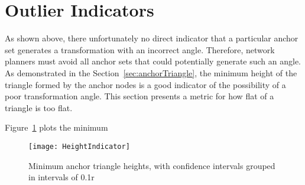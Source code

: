 \section{Outlier Indicators} 

As shown above, there unfortunately no direct indicator that a particular anchor set generates a transformation with an incorrect angle.  Therefore, network planners must avoid all anchor sets that could potentially generate such an angle.  As demonstrated in the Section~\ref{sec:anchorTriangle}, the minimum height of the triangle formed by the anchor nodes is a good indicator of the possibility of a poor transformation angle.  This section presents a metric for how flat of a triangle is too flat.  

Figure~\ref{fig:heightIndicator} plots the minimum

\begin{figure}
  \centering
	\texttt{[image: HeightIndicator]}
	\caption[Minimum anchor triangle heights]{Minimum anchor triangle heights, with confidence intervals grouped in intervals of 0.1r}	
	\label{fig:heightIndicator}
\end{figure}

